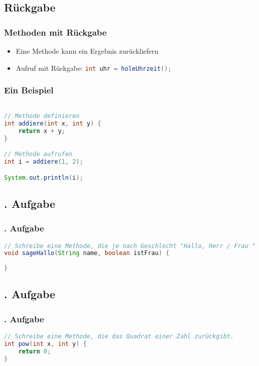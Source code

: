\documentclass{beamer}
\begin{document}
\subsection{R\"uckgabe}
\begin{frame}[fragile]
	\frametitle{Methoden mit R\"uckgabe}
	\begin{itemize}
		\item Eine Methode kann ein Ergebnis zur\"uckliefern
		\item Aufruf mit R\"uckgabe: \lstinline[language=java]{int uhr = holeUhrzeit();}
	\end{itemize}
\end{frame}

\begin{frame}[fragile]
	\frametitle{Ein Beispiel}
	\begin{lstlisting}[language=java]

// Methode definieren
int addiere(int x, int y) {
	return x + y;	
}

// Methode aufrufen
int i = addiere(1, 2);

System.out.println(i);

	\end{lstlisting}
\end{frame}
\subsection{. Aufgabe}
\begin{frame}[fragile]
	\frametitle{. Aufgabe}
		
	\begin{lstlisting}[language=java]
// Schreibe eine Methode, die je nach Geschlecht "Hallo, Herr / Frau " und den Namen ausgibt.
void sageHallo(String name, boolean istFrau) {
	
}
	\end{lstlisting}
\end{frame}
\subsection{. Aufgabe}
\begin{frame}[fragile]
	\frametitle{. Aufgabe}
	\begin{lstlisting}[language=java]
// Schreibe eine Methode, die das Quadrat einer Zahl zurückgibt.
int pow(int x, int y) {
	return 0;
}
	\end{lstlisting}
\end{frame}
\end{document}
